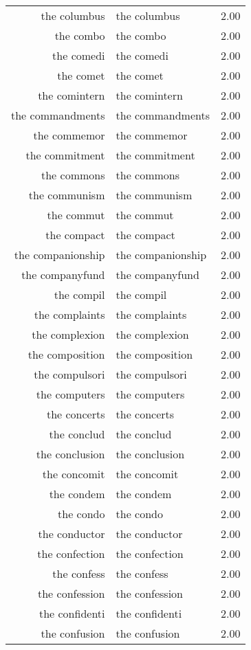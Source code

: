 \begin{table}[ht]
\begin{tabular}{rlr}
  the columbus & the columbus & 2.00 \\ 
  the combo & the combo & 2.00 \\ 
  the comedi & the comedi & 2.00 \\ 
  the comet & the comet & 2.00 \\ 
  the comintern & the comintern & 2.00 \\ 
  the commandments & the commandments & 2.00 \\ 
  the commemor & the commemor & 2.00 \\ 
  the commitment & the commitment & 2.00 \\ 
  the commons & the commons & 2.00 \\ 
  the communism & the communism & 2.00 \\ 
  the commut & the commut & 2.00 \\ 
  the compact & the compact & 2.00 \\ 
  the companionship & the companionship & 2.00 \\ 
  the companyfund & the companyfund & 2.00 \\ 
  the compil & the compil & 2.00 \\ 
  the complaints & the complaints & 2.00 \\ 
  the complexion & the complexion & 2.00 \\ 
  the composition & the composition & 2.00 \\ 
  the compulsori & the compulsori & 2.00 \\ 
  the computers & the computers & 2.00 \\ 
  the concerts & the concerts & 2.00 \\ 
  the conclud & the conclud & 2.00 \\ 
  the conclusion & the conclusion & 2.00 \\ 
  the concomit & the concomit & 2.00 \\ 
  the condem & the condem & 2.00 \\ 
  the condo & the condo & 2.00 \\ 
  the conductor & the conductor & 2.00 \\ 
  the confection & the confection & 2.00 \\ 
  the confess & the confess & 2.00 \\ 
  the confession & the confession & 2.00 \\ 
  the confidenti & the confidenti & 2.00 \\ 
  the confusion & the confusion & 2.00 \\ 

\end{tabular}
\end{table}
